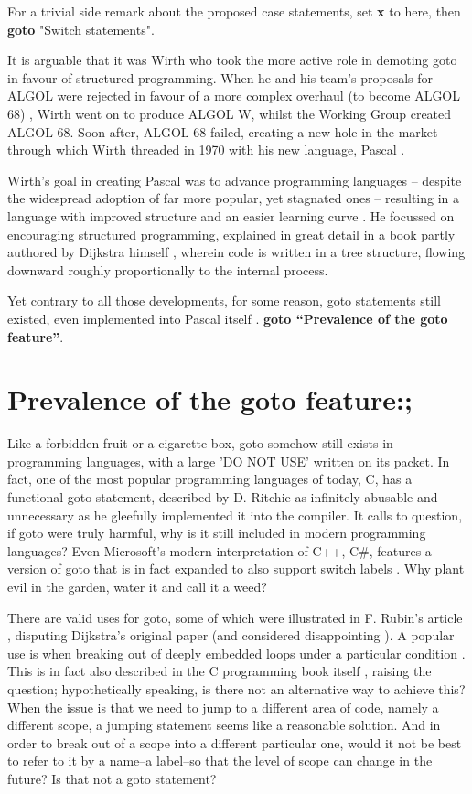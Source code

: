\documentclass{journal}
\begin{document}
For a trivial side remark about the proposed case statements, set \textbf{x} to here, then \textbf{goto} "Switch statements".

It is arguable that it was Wirth who took the more active role in demoting goto in favour of structured programming. When he and his team's proposals for ALGOL were rejected in favour of a more complex overhaul (to become ALGOL 68) \cite{pascalrecollections}, Wirth went on to produce ALGOL W, whilst the Working Group created ALGOL 68. Soon after, ALGOL 68 failed, creating a new hole in the market through which Wirth threaded in 1970 with his new language, Pascal \cite{pascalrecollections}.

Wirth's goal in creating Pascal was to advance programming languages -- despite the widespread adoption of far more popular, yet stagnated ones -- resulting in a language with improved structure and an easier learning curve \cite{pascal}. He focussed on encouraging structured programming, explained in great detail in a book partly authored by Dijkstra himself \cite{structured}, wherein code is written in a tree structure, flowing downward roughly proportionally to the internal process.

Yet contrary to all those developments, for some reason, goto statements still existed, even implemented into Pascal itself \cite{pascal}. \textbf{goto ``Prevalence of the goto feature''}.

\section{\textunderscore \textunderscore Prevalence of the goto feature:;}
Like a forbidden fruit or a cigarette box, goto somehow still exists in programming languages, with a large 'DO NOT USE' written on its packet.  In fact, one of the most popular programming languages of today, C, has a functional goto statement, described by D. Ritchie as infinitely abusable and unnecessary \cite{cprogramming} as he gleefully implemented it into the compiler. It calls to question, if goto were truly harmful, why is it still included in modern programming languages? Even Microsoft's modern interpretation of C++, C\#, features a version of goto that is in fact expanded to also support switch labels \cite{csharp}. Why plant evil in the garden, water it and call it a weed?

There are valid uses for goto, some of which were illustrated in F. Rubin's article \cite{gotoodeep}, disputing Dijkstra's original paper (and considered disappointing \cite{disappointing}). A popular use is when breaking out of deeply embedded loops under a particular condition \cite{gotoodeep}. This is in fact also described in the C programming book itself \cite{cprogramming}, raising the question; hypothetically speaking, is there not an alternative way to achieve this? When the issue is that we need to jump to a different area of code, namely a different scope, a jumping statement seems like a reasonable solution. And in order to break out of a scope into a different particular one, would it not be best to refer to it by a name--a label--so that the level of scope can change in the future? Is that not a goto statement?
\end{document}
